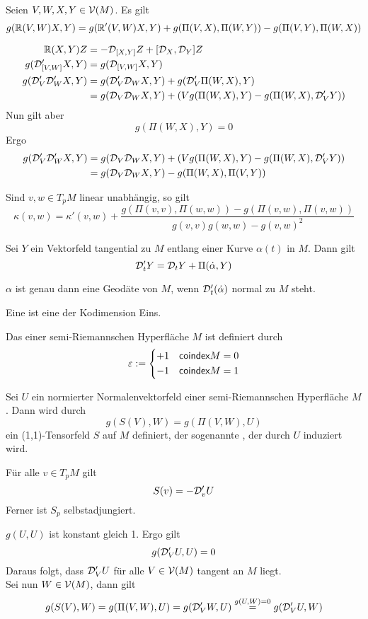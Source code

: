 \documentclass{article}
\begin{document}
Seien $V,W,X,Y \in \mathcal{V}(M)$. Es gilt
\[ g(\mathbb{R}(V,W)X,Y) = g(\mathbb{R}'(V,W)X,Y) + g(\Pi(V,X), \Pi(W,Y )) - g(\Pi(V,Y), \Pi(W,X )) \]
\begin{Beweis}{}
\begin{align*}
\mathbb{R}(X,Y)Z &= -\mathcal{D}_{[X,Y]}Z + [\mathcal{D}_X,\mathcal{D}_Y]Z\\
g(\mathcal{D}'_{[V,W]}X,Y) &= g(\mathcal{D}_{[V,W]}X,Y)\\
g(\mathcal{D}'_V\mathcal{D}'_WX,Y) &= g(\mathcal{D}'_V\mathcal{D}_WX,Y) + g(\mathcal{D}'_V \Pi(W,X), Y)\\
&= g(\mathcal{D}_V\mathcal{D}_WX,Y) + (Vg(\Pi(W,X), Y) - g(\Pi(W,X), \mathcal{D}'_VY ))\\
\end{align*}
Nun gilt aber
\[ g(\Pi(W,X), Y) = 0 \]
Ergo
\begin{align*}
g(\mathcal{D}'_V\mathcal{D}'_WX,Y) &= g(\mathcal{D}_V\mathcal{D}_WX,Y) + (Vg(\Pi(W,X), Y) - g(\Pi(W,X), \mathcal{D}'_VY ))\\
&= g(\mathcal{D}_V\mathcal{D}_WX,Y) -g(\Pi(W,X), \Pi(V,Y) )
\end{align*}
\end{Beweis}

\Kor{}
Sind $v,w \in T_pM$ linear unabhängig, so gilt
\[ \kappa(v,w) = \kappa'(v,w) + \frac{g(\Pi(v,v), \Pi(w,w)) - g(\Pi(v,w), \Pi(v,w))}{g(v,v) g(w,w) - g(v,w)^2} \]

\Prop{}
Sei $Y$ ein Vektorfeld tangential zu $M$ entlang einer Kurve $\alpha(t)$ in $M$. Dann gilt
\[ \mathcal{D}_t' Y = \mathcal{D}_tY + \Pi(\dot{\alpha}, Y) \]

\Kor{}
$\alpha$ ist genau dann eine Geodäte von $M$, wenn $\mathcal{D}'_t(\dot{\alpha})$ normal zu $M$ steht.

\Def{}
Eine  ist eine  der Kodimension Eins.

\Def{}
Das  einer semi-Riemannschen Hyperfläche $M$ ist definiert durch
\[ \varepsilon := \left\lbrace 
\begin{aligned}
+1 && \textsf{coindex}M = 0\\
-1 && \textsf{coindex}M = 1
\end{aligned}
\right. \]

\Def{}
Sei $U$ ein normierter Normalenvektorfeld einer semi-Riemannschen Hyperfläche $M$. Dann wird durch
\[ g(S(V),W)  = g(\Pi(V,W), U)\]
ein (1,1)-Tensorfeld $S$ auf $M$ definiert, der sogenannte , der durch $U$ induziert wird.

\Lem{}
Für alle $v \in T_pM$ gilt
\[ S(v) = -\mathcal{D}'_vU \]
Ferner ist $S_p$ selbstadjungiert.
\begin{Beweis}{}
$g(U,U)$ ist konstant gleich 1. Ergo gilt
\[ g(\mathcal{D}'_VU,U) = 0 \]
Daraus folgt, dass $\mathcal{D}'_VU$ für alle $V \in \mathcal{V}(M)$ tangent an $M$ liegt.\\
Sei nun $W \in \mathcal{V}(M)$, dann gilt
\[ g(S(V),W) = g(\Pi(V,W), U) =g(\mathcal{D}'_VW, U) \overset{g(U,W) = 0}{=} g(\mathcal{D}'_VU,W)   \]
\end{Beweis}
\end{document}
